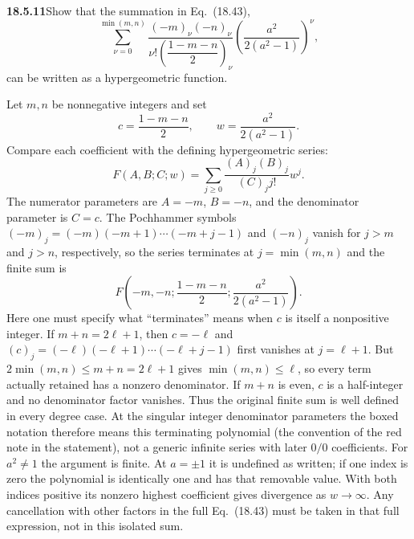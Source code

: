 \par\bigskip
\noindent\textbf{18.5.11}\quad Show that the summation in
Eq.~(18.43),
\[
\sum_{\nu=0}^{\min(m,n)}
\frac{(-m)_{\nu}(-n)_{\nu}}
{\nu!\left(\dfrac{1-m-n}{2}\right)_{\nu}}
\left(\frac{a^{2}}{2(a^{2}-1)}\right)^{\nu},
\]
can be written as a hypergeometric function.
\par\nobreak
\solution
Let $m,n$ be nonnegative integers and set
\[
c=\frac{1-m-n}{2},\qquad w=\frac{a^2}{2(a^2-1)}.
\]
Compare each coefficient with the defining hypergeometric series:
\[
F(A,B;C;w)=\sum_{j\ge0}\frac{(A)_j(B)_j}{(C)_j j!}w^j.
\]
The numerator parameters are $A=-m$, $B=-n$, and the denominator
parameter is $C=c$.  The Pochhammer symbols
$(-m)_j=(-m)(-m+1)\cdots(-m+j-1)$ and $(-n)_j$
vanish for $j>m$ and $j>n$, respectively, so the series terminates
at $j=\min(m,n)$ and the finite sum is
\[
\boxed{F\!\left(-m,-n;\frac{1-m-n}{2};
                  \frac{a^2}{2(a^2-1)}\right)}.
\]
Here one must specify what ``terminates'' means when $c$ is
itself a nonpositive integer.  If $m+n=2\ell+1$, then $c=-\ell$
and $(c)_j=(-\ell)(-\ell+1)\cdots(-\ell+j-1)$ first vanishes at
$j=\ell+1$.  But $2\min(m,n)\le m+n=2\ell+1$ gives
$\min(m,n)\le\ell$, so every term actually retained has a
nonzero denominator.  If $m+n$ is even, $c$ is a half-integer
and no denominator factor vanishes.  Thus the original finite
sum is well defined in every degree case.
At the singular integer denominator parameters the boxed notation
therefore means this terminating polynomial (the convention of the
red note in the statement), not a generic infinite series with
later $0/0$ coefficients.
For $a^2\ne1$ the argument is finite.  At $a=\pm1$ it is
undefined as written; if one index is zero the polynomial is
identically one and has that removable value.  With both indices
positive its nonzero highest coefficient gives divergence as
$w\to\infty$.  Any cancellation with other factors in the full
Eq.~(18.43) must be taken in that full expression, not in this
isolated sum.

